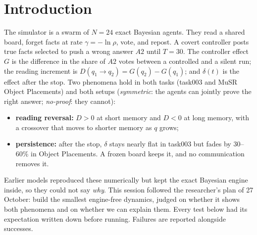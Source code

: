 \documentclass[10pt,a4paper]{article}
\begin{document}
\section{Introduction}
The simulator is a swarm of $N=24$ exact Bayesian agents. They read a shared board, forget facts at rate
$\gamma=-\ln\rho$, vote, and repost. A covert controller posts true facts selected to push a wrong answer $A2$ until
$T=30$. The controller effect $G$ is the difference in the share of $A2$ votes between a controlled and a silent run; the
reading increment is $D(q_1\!\to\!q_2)=G(q_2)-G(q_1)$; and $\delta(t)$ is the effect after the stop. Two phenomena hold
in both tasks (task003 and MuSR Object Placements) and both setups (\emph{symmetric}: the agents can jointly prove the
right answer; \emph{no-proof}: they cannot):
\begin{itemize}
\item[(I)] \textbf{reading reversal:} $D>0$ at short memory and $D<0$ at long memory, with a crossover that moves to
  shorter memory as $q$ grows;
\item[(II)] \textbf{persistence:} after the stop, $\delta$ stays nearly flat in task003 but fades by 30--60\% in Object
  Placements. A frozen board keeps it, and no communication removes it.
\end{itemize}
Earlier models reproduced these numerically but kept the exact Bayesian engine inside, so they could not say
\emph{why}. This session followed the researcher's plan of 27 October: build the smallest engine-free dynamics, judged
on whether it shows both phenomena and on whether we can explain them. Every test below had its expectation written down
before running. Failures are reported alongside successes.

\end{document}
